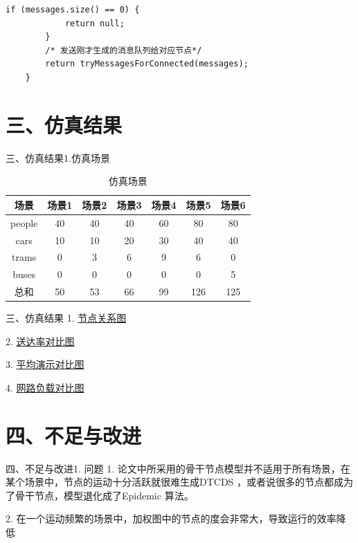 \documentclass[12pt,aspectratio=43,table]{beamer}
\begin{document}
\begin{frame}[fragile]
\begin{lstlisting}
if (messages.size() == 0) {
            return null;
        }
        /* 发送刚才生成的消息队列给对应节点*/
        return tryMessagesForConnected(messages);
    }
\end{lstlisting}
\end{frame}

\section{三、仿真结果}
\begin{frame}{三、仿真结果}{1.仿真场景}
\begin{table}
  \centering
  \begin{tabular}{|c|c|c|c|c|c|c|}
		\hline  %
		场景&场景1&场景2&场景3&场景4&场景5&场景6 \\  %
		\hline
		people&40&40&40&60&80&80 \\
		\hline
		cars&10&10&20&30&40&40 \\
		\hline
        trams&0&3&6&9&6&0 \\
		\hline
        buses&0&0&0&0&0&5 \\
		\hline
        总和&50&53&66&99&126&125 \\
		\hline
	\end{tabular}
  \caption{仿真场景}\label{table1}
\end{table}
\end{frame}

\begin{frame}{三、仿真结果}
1. \href{http://rocksugar.work/iot/NodeNetWork.html}{节点关系图}

2. \href{http://rocksugar.work/iot/DeliveryProbability.html}{送达率对比图}

3. \href{http://rocksugar.work/iot/Latency.html}{平均演示对比图}

4. \href{http://rocksugar.work/iot/OverheadRatio.html}{网路负载对比图}
\end{frame}

\section{四、不足与改进}
\begin{frame}{四、不足与改进}{1. 问题}
1. 论文中所采用的骨干节点模型并不适用于所有场景，在某个场景中，节点的运动十分活跃就很难生成DTCDS ，或者说很多的节点都成为了骨干节点，模型退化成了Epidemic 算法。

2. 在一个运动频繁的场景中，加权图中的节点的度会非常大，导致运行的效率降低
\end{frame}
\end{document}
